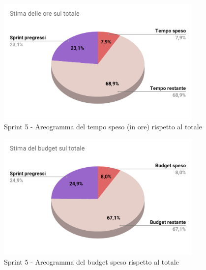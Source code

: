   \begin{figure}[H]
    \centering
    \includegraphics[width=0.90\textwidth]{assets/Consuntivo/Sprint-4/copertura_oraria.pdf}
    \caption{Sprint 5 - Areogramma del tempo speso (in ore) rispetto al totale}
  \end{figure}
  
  \begin{figure}[H]
    \centering
    \includegraphics[width=0.90\textwidth]{assets/Consuntivo/Sprint-4/budget_speso.pdf}
    \caption{Sprint 5 - Areogramma del budget speso rispetto al totale}
  \end{figure}
  

